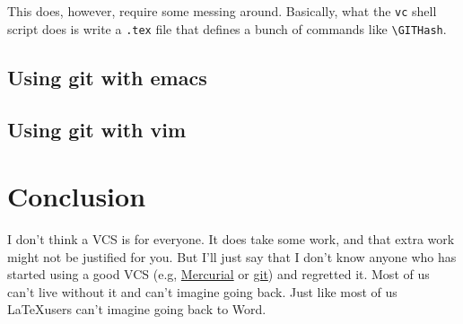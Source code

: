 \documentclass{article}
\begin{document}
This does, however, require some messing around.
Basically, what the \lstinline!vc! shell script does is write a \lstinline!.tex! file
  that defines a bunch of commands like \lstinline!\GITHash!.


\subsection{Using git with emacs}

\subsection{Using git with vim}

\section{Conclusion}

I don’t think a VCS is for everyone. It does take some work, and that 
extra work might not be justified for you. But I’ll just say that I 
don’t know anyone who has started using a good VCS (e.g, 
\href{http://mercurial.selenic.com/}{Mercurial} or 
\href{http://git-scm.com/}{git}) and regretted it. Most of us can’t 
live without it and can’t imagine going back. Just like most of us 
\LaTeX users can’t imagine going back to Word.
\end{document}
